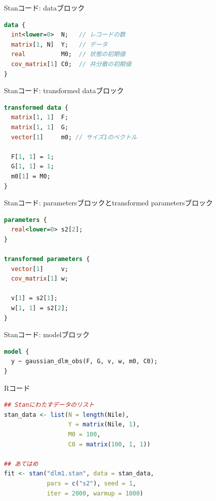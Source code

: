 \documentclass[dvipdfmx,12pt]{beamer}
\begin{document}
\begin{frame}[fragile]{Stanコード: dataブロック}
  \begin{lstlisting}[language=Stan]
data {
  int<lower=0>  N;   // レコードの数
  matrix[1, N]  Y;   // データ
  real          M0;  // 状態の初期値
  cov_matrix[1] C0;  // 共分散の初期値
}
  \end{lstlisting}
\end{frame}

\begin{frame}[fragile]{Stanコード: transformed dataブロック}
  \begin{lstlisting}[language=Stan]
transformed data {
  matrix[1, 1]  F;
  matrix[1, 1]  G;
  vector[1]     m0; // サイズ1のベクトル

  F[1, 1] = 1;
  G[1, 1] = 1;
  m0[1] = M0;
}
  \end{lstlisting}
\end{frame}

\begin{frame}[fragile]{Stanコード: parametersブロックとtransformed parametersブロック}
  \begin{lstlisting}[language=Stan]
parameters {
  real<lower=0> s2[2];
}

transformed parameters {
  vector[1]     v;
  cov_matrix[1] w;

  v[1] = s2[1];
  w[1, 1] = s2[2];
}
  \end{lstlisting}
\end{frame}

\begin{frame}[fragile]{Stanコード: modelブロック}
  \begin{lstlisting}[language=Stan]
model {
  y ~ gaussian_dlm_obs(F, G, v, w, m0, C0);
}
  \end{lstlisting}
\end{frame}

\begin{frame}[fragile]{Rコード}
  \begin{lstlisting}[language=R]
## Stanにわたすデータのリスト
stan_data <- list(N = length(Nile),
                  Y = matrix(Nile, 1),
                  M0 = 100,
                  C0 = matrix(100, 1, 1))

## あてはめ
fit <- stan("dlm1.stan", data = stan_data,
            pars = c("s2"), seed = 1,
            iter = 2000, warmup = 1000)
  \end{lstlisting}
\end{frame}
\end{document}
